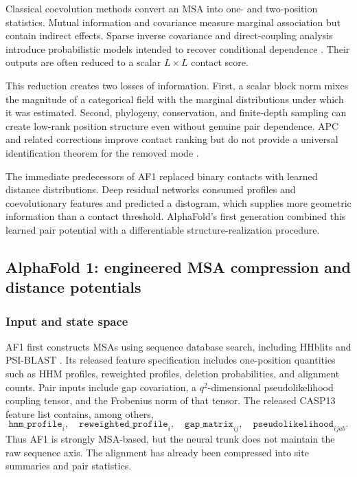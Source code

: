 \documentclass[10pt]{article}
\begin{document}
Classical coevolution methods convert an MSA into one- and two-position statistics.  Mutual
information and covariance measure marginal association but contain indirect effects.  Sparse
inverse covariance and direct-coupling analysis introduce probabilistic models intended to recover
conditional dependence \cite{jones2012,morcos2011,ekeberg2013,cocco2018}.  Their outputs are often
reduced to a scalar $L\times L$ contact score.

This reduction creates two losses of information.  First, a scalar block norm mixes the magnitude
of a categorical field with the marginal distributions under which it was estimated.  Second,
phylogeny, conservation, and finite-depth sampling can create low-rank position structure even
without genuine pair dependence.  APC and related corrections improve contact ranking but do not
provide a universal identification theorem for the removed mode \cite{dunn2008,wang2024}.

The immediate predecessors of AF1 replaced binary contacts with learned distance distributions.
Deep residual networks consumed profiles and coevolutionary features and predicted a distogram,
which supplies more geometric information than a contact threshold.  AlphaFold's first generation
combined this learned pair potential with a differentiable structure-realization procedure.

\subsection{AlphaFold 1: engineered MSA compression and distance potentials}

\subsubsection{Input and state space}

AF1 first constructs MSAs using sequence database search, including HHblits and PSI-BLAST
\cite{senior2020}.  Its released feature specification includes one-position quantities such as
HHM profiles, reweighted profiles, deletion probabilities, and alignment counts.  Pair inputs
include gap covariation, a $q^2$-dimensional pseudolikelihood coupling tensor, and the Frobenius norm
of that tensor.  The released CASP13 feature list contains, among others,
\begin{equation}
\texttt{hmm\_profile}_i,\quad
\texttt{reweighted\_profile}_i,\quad
\texttt{gap\_matrix}_{ij},\quad
\texttt{pseudolikelihood}_{ijab}.
\end{equation}
Thus AF1 is strongly MSA-based, but the neural trunk does not maintain the raw sequence axis.  The
alignment has already been compressed into site summaries and pair statistics.
\end{document}
